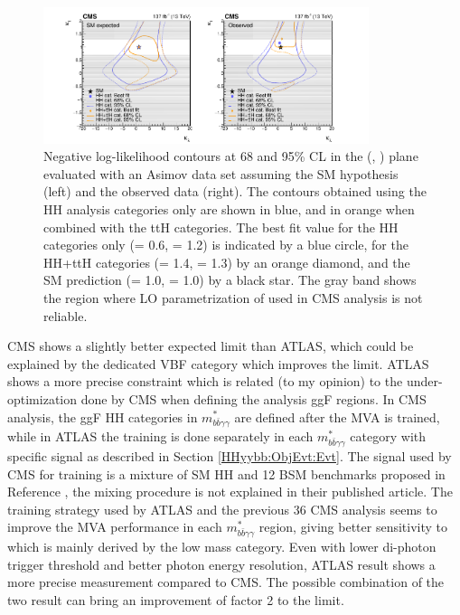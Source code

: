 \begin{figure}[htbp]
    \centering
    \includegraphics[width=0.85\textwidth]{Ch5/Img/CMS-HIG-19-018_kl_LH.pdf}
    \caption{Negative log-likelihood contours at 68 and 95\% CL in the (\kl, \kt) plane evaluated with an Asimov data set assuming the SM hypothesis (left) and the observed data (right). The contours obtained using the HH analysis categories only are shown in blue, and in orange when combined with the ttH categories. The best fit value for the HH categories only (\kl = 0.6, \kt = 1.2) is indicated by a blue circle, for the HH+ttH categories (\kl = 1.4, \kl = 1.3) by an orange diamond, and the SM prediction (\kl = 1.0, \kt = 1.0) by a black star. The gray band shows the region where LO parametrization of \kt used in CMS analysis is not reliable. }
    \label{fig:HHyybb:CMS:LH:2D}
\end{figure}

CMS shows a slightly better expected limit than ATLAS, which could be explained by the dedicated VBF category which improves the limit. ATLAS shows a more precise \kl constraint which is related (to my opinion) to the under-optimization done by CMS when defining the analysis ggF regions. In CMS analysis, the ggF HH categories in $m_{b \bar{b} \gamma \gamma}^{*}$ are defined after the MVA is trained, while in ATLAS the training is done separately in each $m_{b \bar{b} \gamma \gamma}^{*}$ category with specific signal as described in Section \ref{HHyybb:ObjEvt:Evt}. The signal used by CMS for training is a mixture of SM HH and 12 BSM benchmarks proposed in Reference \cite{CMS_BSM}, the mixing procedure is not explained in their published article. The training strategy used by ATLAS and the previous 36 \ifb CMS analysis seems to improve the MVA performance in each $m_{b \bar{b} \gamma \gamma}^{*}$ region, giving better sensitivity to \kl which is mainly derived by the low mass category. Even with lower di-photon trigger threshold and better photon energy resolution, ATLAS result shows a more precise measurement compared to CMS. The possible combination of the two result can bring an improvement of factor 2 to the limit. \\

